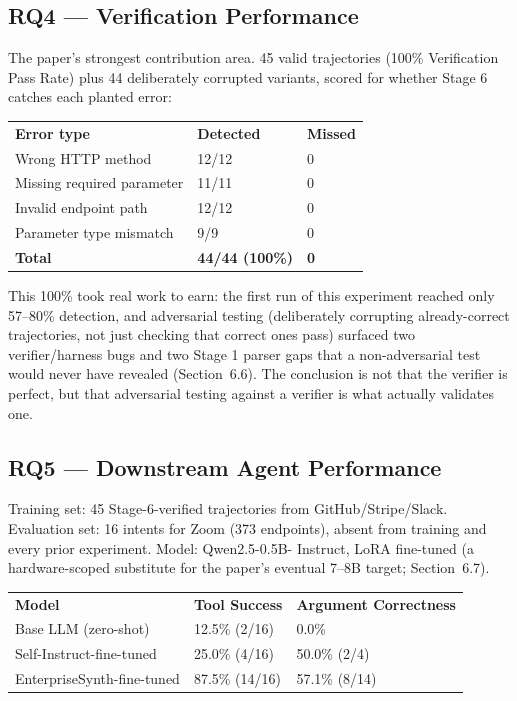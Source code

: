 \documentclass[11pt]{article}
\begin{document}
\subsection{RQ4 --- Verification Performance}
The paper's strongest contribution area. 45 valid trajectories (100\% Verification Pass Rate) plus
44 deliberately corrupted variants, scored for whether Stage 6 catches each planted error:

\begin{center}
\begin{tabular}{lll}
\textbf{Error type} & \textbf{Detected} & \textbf{Missed} \\
Wrong HTTP method & 12/12 & 0 \\
Missing required parameter & 11/11 & 0 \\
Invalid endpoint path & 12/12 & 0 \\
Parameter type mismatch & 9/9 & 0 \\
\textbf{Total} & \textbf{44/44 (100\%)} & \textbf{0} \\
\end{tabular}
\end{center}

This 100\% took real work to earn: the first run of this experiment reached only 57--80\%
detection, and adversarial testing (deliberately corrupting already-correct trajectories, not just
checking that correct ones pass) surfaced two verifier/harness bugs and two Stage 1 parser gaps
that a non-adversarial test would never have revealed (Section~6.6). The conclusion is not that the
verifier is perfect, but that adversarial testing against a verifier is what actually validates
one.

\subsection{RQ5 --- Downstream Agent Performance}
Training set: 45 Stage-6-verified trajectories from GitHub/Stripe/Slack. Evaluation set: 16 intents
for Zoom (373 endpoints), absent from training and every prior experiment. Model: Qwen2.5-0.5B-
Instruct, LoRA fine-tuned (a hardware-scoped substitute for the paper's eventual 7--8B target;
Section~6.7).

\begin{center}
\begin{tabular}{lll}
\textbf{Model} & \textbf{Tool Success} & \textbf{Argument Correctness} \\
Base LLM (zero-shot) & 12.5\% (2/16) & 0.0\% \\
Self-Instruct-fine-tuned & 25.0\% (4/16) & 50.0\% (2/4) \\
EnterpriseSynth-fine-tuned & 87.5\% (14/16) & 57.1\% (8/14) \\
\end{tabular}
\end{center}
\end{document}
